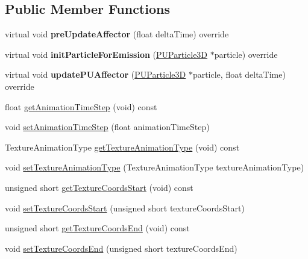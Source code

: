 \subsection*{Public Member Functions}
\begin{DoxyCompactItemize}
\item 
\mbox{\label{classPUTextureAnimator_a097597a0c4a6460c66881f40a80f098a}} 
virtual void {\bfseries pre\+Update\+Affector} (float delta\+Time) override
\item 
\mbox{\label{classPUTextureAnimator_a9ab64dc3beda881ac9f6db553a26cc35}} 
virtual void {\bfseries init\+Particle\+For\+Emission} (\hyperlink{structPUParticle3D}{P\+U\+Particle3D} $\ast$particle) override
\item 
\mbox{\label{classPUTextureAnimator_a07016d942681b40c0d1bd56c34753e59}} 
virtual void {\bfseries update\+P\+U\+Affector} (\hyperlink{structPUParticle3D}{P\+U\+Particle3D} $\ast$particle, float delta\+Time) override
\item 
float \hyperlink{classPUTextureAnimator_a62c538e770b330f543cd2e9dada3b628}{get\+Animation\+Time\+Step} (void) const
\item 
void \hyperlink{classPUTextureAnimator_a30b55a0ffb5b0e96f9f04a0731f86894}{set\+Animation\+Time\+Step} (float animation\+Time\+Step)
\item 
Texture\+Animation\+Type \hyperlink{classPUTextureAnimator_a8fdc03b8304228f9bd84470e88d2d548}{get\+Texture\+Animation\+Type} (void) const
\item 
void \hyperlink{classPUTextureAnimator_ad026f691979e84924cb94227e5893ab8}{set\+Texture\+Animation\+Type} (Texture\+Animation\+Type texture\+Animation\+Type)
\item 
unsigned short \hyperlink{classPUTextureAnimator_ae0cca6bdadc0efc89f1bb73582b26618}{get\+Texture\+Coords\+Start} (void) const
\item 
void \hyperlink{classPUTextureAnimator_a6a36ac552c18aec4bba640b9c75c0cd3}{set\+Texture\+Coords\+Start} (unsigned short texture\+Coords\+Start)
\item 
unsigned short \hyperlink{classPUTextureAnimator_ada75476207f3dd94b93c0420b48e5fdc}{get\+Texture\+Coords\+End} (void) const
\item 
void \hyperlink{classPUTextureAnimator_a16426b883a49629f1dd822353a055998}{set\+Texture\+Coords\+End} (unsigned short texture\+Coords\+End)

\end{DoxyCompactItemize}
